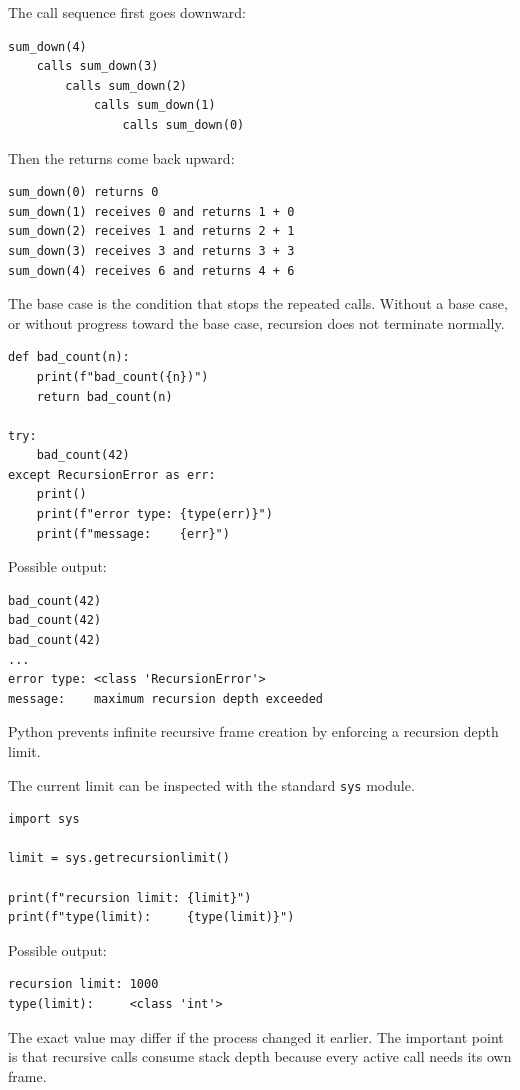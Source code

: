 The call sequence first goes downward:

\begin{verbatim}
sum_down(4)
    calls sum_down(3)
        calls sum_down(2)
            calls sum_down(1)
                calls sum_down(0)
\end{verbatim}

Then the returns come back upward:

\begin{verbatim}
sum_down(0) returns 0
sum_down(1) receives 0 and returns 1 + 0
sum_down(2) receives 1 and returns 2 + 1
sum_down(3) receives 3 and returns 3 + 3
sum_down(4) receives 6 and returns 4 + 6
\end{verbatim}

The base case is the condition that stops the repeated calls. Without a base case, or without progress toward the base case, recursion does not terminate normally.

\begin{verbatim}
def bad_count(n):
    print(f"bad_count({n})")
    return bad_count(n)

try:
    bad_count(42)
except RecursionError as err:
    print()
    print(f"error type: {type(err)}")
    print(f"message:    {err}")
\end{verbatim}

Possible output:

\begin{verbatim}
bad_count(42)
bad_count(42)
bad_count(42)
...
error type: <class 'RecursionError'>
message:    maximum recursion depth exceeded
\end{verbatim}

Python prevents infinite recursive frame creation by enforcing a recursion depth limit.

The current limit can be inspected with the standard \texttt{sys} module.

\begin{verbatim}
import sys

limit = sys.getrecursionlimit()

print(f"recursion limit: {limit}")
print(f"type(limit):     {type(limit)}")
\end{verbatim}

Possible output:

\begin{verbatim}
recursion limit: 1000
type(limit):     <class 'int'>
\end{verbatim}

The exact value may differ if the process changed it earlier. The important point is that recursive calls consume stack depth because every active call needs its own frame.

